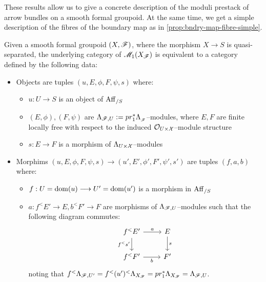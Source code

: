 \documentclass[11pt]{amsart}
\begin{document}
These results allow us to give a concrete description of the moduli prestack
of arrow bundles on a smooth formal groupoid. At the same time, we get
a simple description of the fibres of the boundary map as in
\cref{prop:bndry-map-fibre-simple}.

\begin{thm}\label{thm:mod-arr-bun-formal-grpd-concrete}
Given a smooth formal groupoid $(X, \mathscr{F})$, where the morphism $X \to S$
is quasi-separated, the underlying category of $\mathscr{M}_1(X_\mathscr{F})$ is equivalent
to a category defined by the following data:
\begin{itemize}
\item Objects are tuples $(u, E, \phi, F, \psi, s)$ where:
  \begin{itemize}
  \item $u : U \to S$ is an object of $\mathrm{Aff}_{/S}$
  \item $(E, \phi), (F, \psi)$ are
  $\Lambda_{\mathscr{F}, U} := pr_1^*\Lambda_{_\mathscr{F}}$--modules, where
  $E, F$ are finite locally free with respect to the induced
  $\mathcal{O}_{U \times \mathcal{X}}$--module structure
  \item $s : E \to F$ is a morphism of $\Lambda_{U \times \mathcal{X}}$--modules
  \end{itemize}
\item Morphims $(u, E, \phi, F, \psi, s) \to (u', E', \phi', F', \psi', s')$
  are tuples $(f, a, b)$ where:
  \begin{itemize}
  \item $f : U = \dom(u) \to U' = \dom(u')$ is a morphism in $\mathrm{Aff}_{/S}$
  \item $a : f^<E' \to E, b^<F' \to F$ are morphisms of
    $\Lambda_{\mathscr{F}, U}$--modules such that the following diagram commutes:
    \[\begin{tikzcd}
    f^<E' \ar[r, "a"] \ar[d, "f^<s'" left] & E \ar[d, "s"] \\
    f^<F' \ar[r, "b" below] & F'
    \end{tikzcd}\]
    noting that $f^<\Lambda_{\mathscr{F}, U'} = f^<(u')^<\Lambda_{X_\mathscr{F}} =
    pr_1^*\Lambda_{X_\mathscr{F}} = \Lambda_{\mathscr{F}, U}$.
  \end{itemize}
\end{itemize}
\end{thm}
\end{document}
